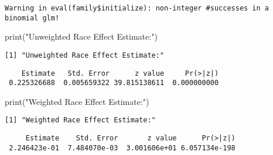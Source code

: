 \documentclass[
  letterpaper,
  DIV=11,
  numbers=noendperiod]{scrartcl}
\newenvironment{Shaded}{\begin{snugshade}}{\end{snugshade}}
\newcommand{\FunctionTok}[1]{\textcolor[rgb]{0.28,0.35,0.67}{#1}}
\newcommand{\NormalTok}[1]{\textcolor[rgb]{0.00,0.23,0.31}{#1}}
\newcommand{\SpecialCharTok}[1]{\textcolor[rgb]{0.37,0.37,0.37}{#1}}
\newcommand{\StringTok}[1]{\textcolor[rgb]{0.13,0.47,0.30}{#1}}
\begin{document}
\begin{verbatim}
Warning in eval(family$initialize): non-integer #successes in a binomial glm!
\end{verbatim}

\begin{Shaded}
\begin{Highlighting}[]
\FunctionTok{print}\NormalTok{(}\StringTok{"Unweighted Race Effect Estimate:"}\NormalTok{)}
\end{Highlighting}
\end{Shaded}

\begin{verbatim}
[1] "Unweighted Race Effect Estimate:"
\end{verbatim}

\begin{Shaded}
\end{Shaded}

\begin{verbatim}
    Estimate   Std. Error      z value     Pr(>|z|) 
 0.225326688  0.005659322 39.815138611  0.000000000 
\end{verbatim}

\begin{Shaded}
\begin{Highlighting}[]
\FunctionTok{print}\NormalTok{(}\StringTok{"Weighted Race Effect Estimate:"}\NormalTok{)}
\end{Highlighting}
\end{Shaded}

\begin{verbatim}
[1] "Weighted Race Effect Estimate:"
\end{verbatim}

\begin{Shaded}
\end{Shaded}

\begin{verbatim}
     Estimate    Std. Error       z value      Pr(>|z|) 
 2.246423e-01  7.484070e-03  3.001606e+01 6.057134e-198 
\end{verbatim}
\end{document}
